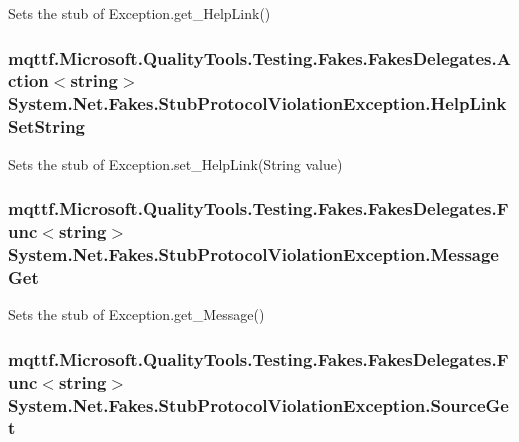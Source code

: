 Sets the stub of Exception.\-get\-\_\-\-Help\-Link()

\hypertarget{class_system_1_1_net_1_1_fakes_1_1_stub_protocol_violation_exception_af59b1280bd6de2232331eae09262b5c8}{
\subsubsection[{Help\-Link\-Set\-String}]{\setlength{\rightskip}{0pt plus 5cm}mqttf.\-Microsoft.\-Quality\-Tools.\-Testing.\-Fakes.\-Fakes\-Delegates.\-Action$<$string$>$ System.\-Net.\-Fakes.\-Stub\-Protocol\-Violation\-Exception.\-Help\-Link\-Set\-String}}\label{class_system_1_1_net_1_1_fakes_1_1_stub_protocol_violation_exception_af59b1280bd6de2232331eae09262b5c8}


Sets the stub of Exception.\-set\-\_\-\-Help\-Link(\-String value)

\hypertarget{class_system_1_1_net_1_1_fakes_1_1_stub_protocol_violation_exception_a454ff342a093b628cc655f2607b08aa1}{
\subsubsection[{Message\-Get}]{\setlength{\rightskip}{0pt plus 5cm}mqttf.\-Microsoft.\-Quality\-Tools.\-Testing.\-Fakes.\-Fakes\-Delegates.\-Func$<$string$>$ System.\-Net.\-Fakes.\-Stub\-Protocol\-Violation\-Exception.\-Message\-Get}}\label{class_system_1_1_net_1_1_fakes_1_1_stub_protocol_violation_exception_a454ff342a093b628cc655f2607b08aa1}


Sets the stub of Exception.\-get\-\_\-\-Message()

\hypertarget{class_system_1_1_net_1_1_fakes_1_1_stub_protocol_violation_exception_a546ebed69f2d315ea41088cf7a63b002}{
\subsubsection[{Source\-Get}]{\setlength{\rightskip}{0pt plus 5cm}mqttf.\-Microsoft.\-Quality\-Tools.\-Testing.\-Fakes.\-Fakes\-Delegates.\-Func$<$string$>$ System.\-Net.\-Fakes.\-Stub\-Protocol\-Violation\-Exception.\-Source\-Get}}\label{class_system_1_1_net_1_1_fakes_1_1_stub_protocol_violation_exception_a546ebed69f2d315ea41088cf7a63b002}



